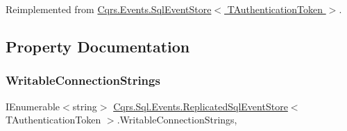 Reimplemented from \hyperlink{classCqrs_1_1Events_1_1SqlEventStore_a8d67570d50a97050cbce5a29d7a4b9f6}{Cqrs.\+Events.\+Sql\+Event\+Store$<$ T\+Authentication\+Token $>$}.



\subsection{Property Documentation}
\mbox{\label{classCqrs_1_1Sql_1_1Events_1_1ReplicatedSqlEventStore_af7275b09a11b2c7da447019636a5e0f9}} 
\subsubsection{\texorpdfstring{Writable\+Connection\+Strings}{WritableConnectionStrings}}
{\footnotesize\ttfamily I\+Enumerable$<$string$>$ \hyperlink{classCqrs_1_1Sql_1_1Events_1_1ReplicatedSqlEventStore}{Cqrs.\+Sql.\+Events.\+Replicated\+Sql\+Event\+Store}$<$ T\+Authentication\+Token $>$.Writable\+Connection\+Strings\hspace{0.3cm}{\ttfamily [get]}, {\ttfamily [protected]}}

